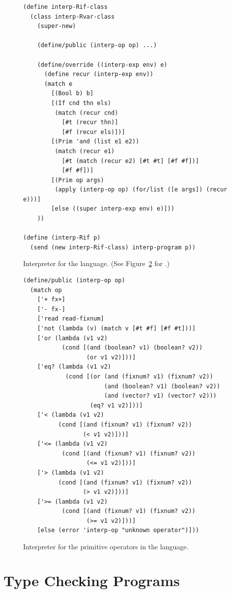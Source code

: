 \documentclass[11pt]{book}
\begin{document}
\begin{figure}[tbp]
\begin{lstlisting}
(define interp-Rif-class
  (class interp-Rvar-class
    (super-new)

    (define/public (interp-op op) ...)

    (define/override ((interp-exp env) e)
      (define recur (interp-exp env))
      (match e
        [(Bool b) b]
        [(If cnd thn els)
         (match (recur cnd)
           [#t (recur thn)]
           [#f (recur els)])]
        [(Prim 'and (list e1 e2))
         (match (recur e1)
           [#t (match (recur e2) [#t #t] [#f #f])]
           [#f #f])]
        [(Prim op args)
         (apply (interp-op op) (for/list ([e args]) (recur e)))]
        [else ((super interp-exp env) e)]))
    ))

(define (interp-Rif p)
  (send (new interp-Rif-class) interp-program p))
\end{lstlisting}
\caption{Interpreter for the \LangIf{} language. (See
  Figure~\ref{fig:interp-op-Rif} for .)}
\label{fig:interp-Rif}
\end{figure}

\begin{figure}[tbp]
\begin{lstlisting}
(define/public (interp-op op)
  (match op
    ['+ fx+]
    ['- fx-]
    ['read read-fixnum]
    ['not (lambda (v) (match v [#t #f] [#f #t]))]
    ['or (lambda (v1 v2)
           (cond [(and (boolean? v1) (boolean? v2))
                  (or v1 v2)]))]
    ['eq? (lambda (v1 v2)
            (cond [(or (and (fixnum? v1) (fixnum? v2))
                       (and (boolean? v1) (boolean? v2))
                       (and (vector? v1) (vector? v2)))
                   (eq? v1 v2)]))]
    ['< (lambda (v1 v2)
          (cond [(and (fixnum? v1) (fixnum? v2))
                 (< v1 v2)]))]
    ['<= (lambda (v1 v2)
           (cond [(and (fixnum? v1) (fixnum? v2))
                  (<= v1 v2)]))]
    ['> (lambda (v1 v2)
          (cond [(and (fixnum? v1) (fixnum? v2))
                 (> v1 v2)]))]
    ['>= (lambda (v1 v2)
           (cond [(and (fixnum? v1) (fixnum? v2))
                  (>= v1 v2)]))]
    [else (error 'interp-op "unknown operator")]))
\end{lstlisting}
\caption{Interpreter for the primitive operators in the \LangIf{} language.}
\label{fig:interp-op-Rif}
\end{figure}


\section{Type Checking \LangIf{} Programs}
\label{sec:type-check-Rif}
\end{document}
